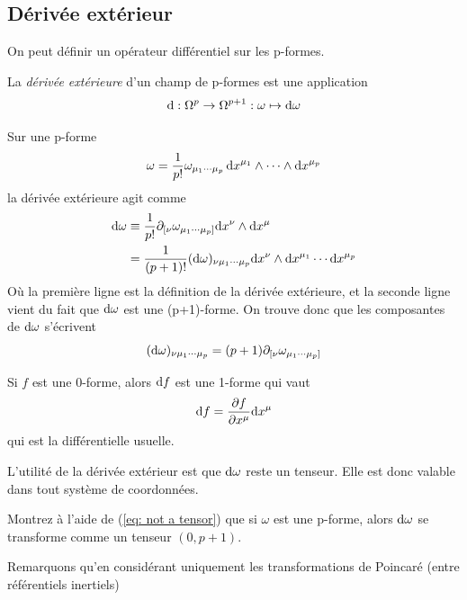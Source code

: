 \subsection{Dérivée extérieur}
On peut définir un opérateur différentiel sur les p-formes.
\begin{theoremframe}
    \begin{defi}
        La \emph{dérivée extérieure} d'un champ de p-formes est une application
        \begin{equation}
            \mathrm{d} :\Omega^p \to \Omega^{p+1}:\omega \mapsto \mathrm{d} \omega 
        \end{equation}
    \end{defi}
\end{theoremframe}
Sur une p-forme 
\begin{equation}
     \omega = \frac{1}{p!}\omega_{\mu_1 \cdots \mu_p}\, \mathrm{d} x^{\mu_1}\wedge \cdots \wedge \mathrm{d} x^{\mu_p}
\end{equation}
la dérivée extérieure agit comme
\begin{align}
    \mathrm{d} \omega  &\equiv \frac{1}{p!}\partial_{[{\nu }}\omega _{\mu_1 \cdots \mu_p]}\mathrm{d} x^{\nu}\wedge \mathrm{d} x^{\mu}\\
    &= \frac{1}{(p+1)!}(\mathrm{d} \omega )_{\nu \mu_1 \cdots \mu_p}\mathrm{d} x^{\nu}\wedge \mathrm{d} x^{\mu_1}\cdots \mathrm{d} x^{\mu_p}
\end{align}
Où la première ligne est la définition de la dérivée extérieure, et la seconde ligne vient du fait que $\mathrm{d} \omega $ est une (p+1)-forme. On trouve donc que les composantes de $\mathrm{d} \omega $ s'écrivent
\begin{equation}
    (\mathrm{d} \omega )_{\nu \mu_1 \cdots \mu_p} = (p+1)\partial_{[{\nu }}\omega _{\mu_1 \cdots \mu_p]}
\end{equation}
\begin{rmk}
    Si $f $ est une 0-forme, alors $\mathrm{d} f$ est une 1-forme qui vaut
    \begin{equation} 
    \mathrm{d} f = \frac{\partial f}{\partial x^{\mu}}\mathrm{d} x^{\mu}
    \end{equation}
    qui est la différentielle usuelle.
\end{rmk}
\cutebreak
L'utilité de la dérivée extérieur est que $\mathrm{d} \omega $ reste un tenseur. Elle est donc valable dans tout système de coordonnées.
\begin{exerc}
    Montrez à l'aide de (\ref{eq: not a tensor}) que si $\omega $ est une p-forme, alors $\mathrm{d} \omega $ se transforme comme un tenseur $(0,p+1)$.
\end{exerc}
Remarquons qu'en considérant uniquement les transformations de Poincaré (entre référentiels inertiels)
